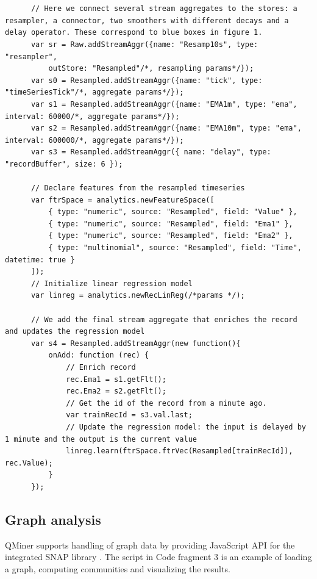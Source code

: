 \documentclass{article} %
\begin{document}
      \begin{lstlisting}[caption=Time series processing] 	


      // Here we connect several stream aggregates to the stores: a resampler, a connector, two smoothers with different decays and a delay operator. These correspond to blue boxes in figure 1.
      var sr = Raw.addStreamAggr({name: "Resamp10s", type: "resampler",
          outStore: "Resampled"/*, resampling params*/});
      var s0 = Resampled.addStreamAggr({name: "tick", type: "timeSeriesTick"/*, aggregate params*/});
      var s1 = Resampled.addStreamAggr({name: "EMA1m", type: "ema", interval: 60000/*, aggregate params*/});
      var s2 = Resampled.addStreamAggr({name: "EMA10m", type: "ema", interval: 600000/*, aggregate params*/});
      var s3 = Resampled.addStreamAggr({ name: "delay", type: "recordBuffer", size: 6 });

      // Declare features from the resampled timeseries
      var ftrSpace = analytics.newFeatureSpace([
          { type: "numeric", source: "Resampled", field: "Value" },
          { type: "numeric", source: "Resampled", field: "Ema1" },
          { type: "numeric", source: "Resampled", field: "Ema2" },
          { type: "multinomial", source: "Resampled", field: "Time", datetime: true }
      ]);
      // Initialize linear regression model
      var linreg = analytics.newRecLinReg(/*params */);

      // We add the final stream aggregate that enriches the record and updates the regression model
      var s4 = Resampled.addStreamAggr(new function(){
          onAdd: function (rec) {
              // Enrich record
              rec.Ema1 = s1.getFlt();
              rec.Ema2 = s2.getFlt();
              // Get the id of the record from a minute ago.
              var trainRecId = s3.val.last;
              // Update the regression model: the input is delayed by 1 minute and the output is the current value
              linreg.learn(ftrSpace.ftrVec(Resampled[trainRecId]), rec.Value);
          }
      });
      \end{lstlisting}


\subsection{Graph analysis}
QMiner supports handling of graph data by providing JavaScript API for the integrated SNAP library \cite{snap}.
The script in Code fragment 3 is an example of loading a graph, computing communities and visualizing the results.
\end{document}
